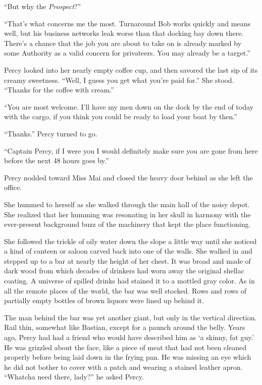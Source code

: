 \documentclass[
]{scrbook}
\begin{document}
``But why the \emph{Prospect}?''

``That's what concerns me the most. Turnaround Bob works quickly and
means well, but his business networks leak worse than that docking bay
down there. There's a chance that the job you are about to take on is
already marked by some Authority as a valid concern for privateers. You
may already be a target.''

Percy looked into her nearly empty coffee cup, and then savored the last
sip of its creamy sweetness. ``Well, I guess you get what you're paid
for.'' She stood. ``Thanks for the coffee with cream.''

``You are most welcome. I'll have my men down on the dock by the end of
today with the cargo, if you think you could be ready to load your boat
by then.''

``Thanks.'' Percy turned to go.

``Captain Percy, if I were you I would definitely make sure you are gone
from here before the next 48 hours goes by.''

Percy nodded toward Miss Mai and closed the heavy door behind as she
left the office.

\bigskip

She hummed to herself as she walked through the main hall of the noisy
depot. She realized that her humming was resonating in her skull in
harmony with the ever-present background buzz of the machinery that kept
the place functioning.

She followed the trickle of oily water down the slope a little way until
she noticed a kind of canteen or saloon carved back into one of the
walls. She walked in and stepped up to a bar at nearly the height of her
chest. It was broad and made of dark wood from which decades of drinkers
had worn away the original shellac coating. A universe of spilled drinks
had stained it to a mottled gray color. As in all the remote places of
the world, the bar was well stocked. Rows and rows of partially empty
bottles of brown liquors were lined up behind it.

The man behind the bar was yet another giant, but only in the vertical
direction. Rail thin, somewhat like Bastian, except for a paunch around
the belly. Years ago, Percy had had a friend who would have described
him as `a skinny, fat guy.' He was grizzled about the face, like a piece
of meat that had not been cleaned properly before being laid down in the
frying pan. He was missing an eye which he did not bother to cover with
a patch and wearing a stained leather apron. ``Whatcha need there,
lady?'' he asked Percy.
\end{document}
